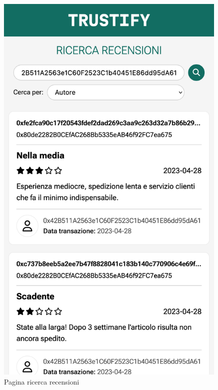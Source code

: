 \begin{figure}
      \includegraphics[scale=0.15]{src/img/ricerca_recensioni_valid.png}
      \caption{Pagina ricerca recensioni}\label{fig:ricerca_recensioni_valid}
    \endminipage\hfill
\end{figure}